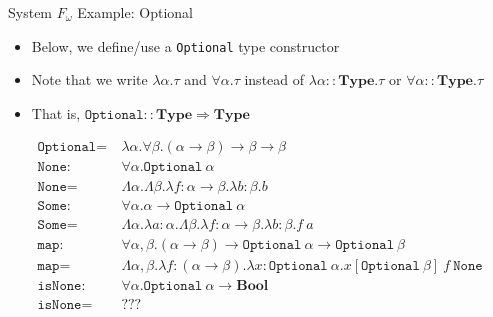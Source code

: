 \documentclass[leqno,presentation,usenames,dvipsnames]{beamer}
\newcommand{\bool}{\textbf{Bool}}
\newcommand{\Type}{\textbf{Type}}
\begin{document}
\begin{frame}[fragile]{System $F_\omega$ Example: Optional}
    \begin{itemize}
        \item Below, we define/use a \texttt{Optional} type constructor
        \item Note that we write $\lambda \alpha. \tau$ and $\forall \alpha. \tau$ instead of $\lambda \alpha :: \Type. \tau$ or $\forall \alpha :: \Type. \tau$
        \item That is, $\texttt{Optional} :: \Type \Rightarrow \Type$
    \end{itemize}
    \footnotesize
    \begin{align*}
        \texttt{Optional} = &~\lambda \alpha. \forall \beta. (\alpha \to \beta) \to \beta \to \beta \\
        \texttt{None} : &~ \forall \alpha. \texttt{Optional}~\alpha \\
        \texttt{None} = &~ \Lambda \alpha. \Lambda \beta. \lambda f : \alpha \to \beta. \lambda b : \beta. b \\
        \texttt{Some} : &~ \forall \alpha. \alpha \to \texttt{Optional}~\alpha \\
        \texttt{Some} = &~ \Lambda \alpha. \lambda a : \alpha. \Lambda \beta. \lambda f : \alpha \to \beta. \lambda b : \beta. f~a \\
        \texttt{map} : &~ \forall \alpha, \beta. (\alpha \to \beta) \to \texttt{Optional}~\alpha \to \texttt{Optional}~\beta \\
        \texttt{map} = &~ \Lambda \alpha, \beta. \lambda f : (\alpha \to \beta). \lambda x : \texttt{Optional}~\alpha. x[\texttt{Optional}~\beta]~f~\texttt{None} \\
        \texttt{isNone} : &~ \forall \alpha. \texttt{Optional}~\alpha \to \bool \\
        \texttt{isNone} = &~ ???
    \end{align*}
\end{frame}
\end{document}
